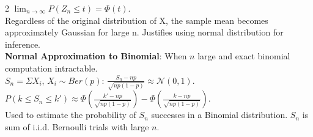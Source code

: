 \documentclass[10pt]{article}
\begin{document}
\begin{multicols*}{2}
$\lim_{n\rightarrow\infty}P(Z_n \le t) = \Phi(t)$.\\
Regardless of the original distribution of X, the sample mean becomes approximately Gaussian for large n. Justifies using normal distribution for inference.\\
\textbf{Normal Approximation to Binomial}: When $n$ large and exact binomial computation intractable.\\
$S_n = \Sigma X_i$, $X_i\sim Ber(p)$: $\frac{S_n - np}{\sqrt{np(1-p)}}\approx \mathcal{N}(0,1)$.\\
$P(k \le S_n \le k') \approx \Phi\left(\frac{k'-np}{\sqrt{np(1-p)}}\right) - \Phi\left(\frac{k-np}{\sqrt{np(1-p)}}\right)$.\\
Used to estimate the probability of $S_n$ successes in a Binomial distribution. $S_n$ is sum of i.i.d. Bernoulli trials with large $n$.

\columnbreak

\end{multicols*}
\end{document}
